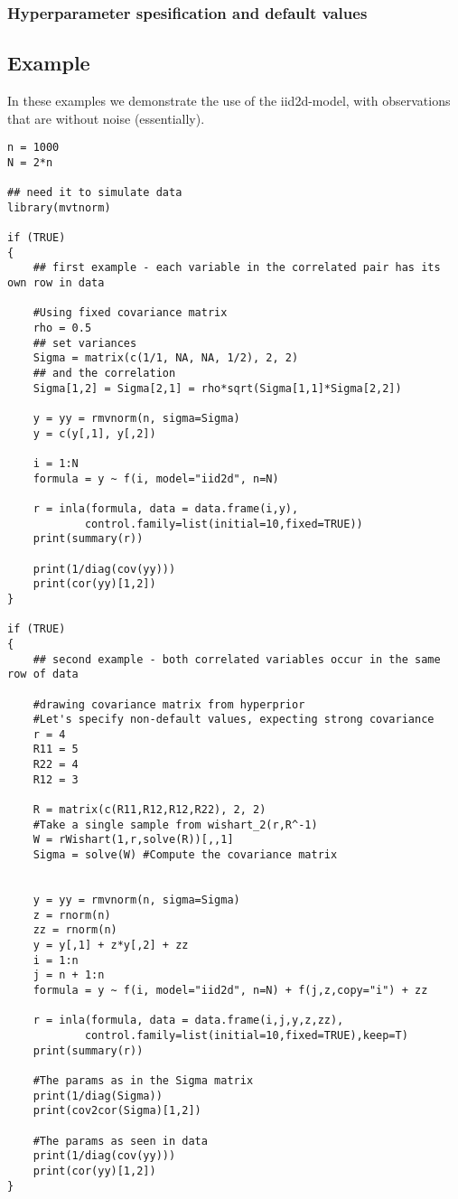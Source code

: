 \documentclass[a4paper,11pt]{article}
\begin{document}
\subsubsection*{Hyperparameter spesification and default values}



\subsection*{Example}
In these examples we demonstrate the use of the iid2d-model, with
observations that are without noise (essentially).
\begin{verbatim}
n = 1000
N = 2*n

## need it to simulate data
library(mvtnorm)

if (TRUE)
{
    ## first example - each variable in the correlated pair has its own row in data 
  
    #Using fixed covariance matrix
    rho = 0.5
    ## set variances
    Sigma = matrix(c(1/1, NA, NA, 1/2), 2, 2)
    ## and the correlation
    Sigma[1,2] = Sigma[2,1] = rho*sqrt(Sigma[1,1]*Sigma[2,2])
    
    y = yy = rmvnorm(n, sigma=Sigma)
    y = c(y[,1], y[,2])

    i = 1:N
    formula = y ~ f(i, model="iid2d", n=N)

    r = inla(formula, data = data.frame(i,y),
            control.family=list(initial=10,fixed=TRUE))
    print(summary(r))

    print(1/diag(cov(yy)))
    print(cor(yy)[1,2])
}

if (TRUE)
{
    ## second example - both correlated variables occur in the same row of data
  
    #drawing covariance matrix from hyperprior
    #Let's specify non-default values, expecting strong covariance
    r = 4
    R11 = 5
    R22 = 4
    R12 = 3

    R = matrix(c(R11,R12,R12,R22), 2, 2)
    #Take a single sample from wishart_2(r,R^-1)
    W = rWishart(1,r,solve(R))[,,1]
    Sigma = solve(W) #Compute the covariance matrix
  

    y = yy = rmvnorm(n, sigma=Sigma)
    z = rnorm(n)
    zz = rnorm(n)
    y = y[,1] + z*y[,2] + zz
    i = 1:n
    j = n + 1:n
    formula = y ~ f(i, model="iid2d", n=N) + f(j,z,copy="i") + zz 

    r = inla(formula, data = data.frame(i,j,y,z,zz),
            control.family=list(initial=10,fixed=TRUE),keep=T)
    print(summary(r))
    
    #The params as in the Sigma matrix
    print(1/diag(Sigma))
    print(cov2cor(Sigma)[1,2])
    
    #The params as seen in data
    print(1/diag(cov(yy)))
    print(cor(yy)[1,2])
}
\end{verbatim}
\end{document}

